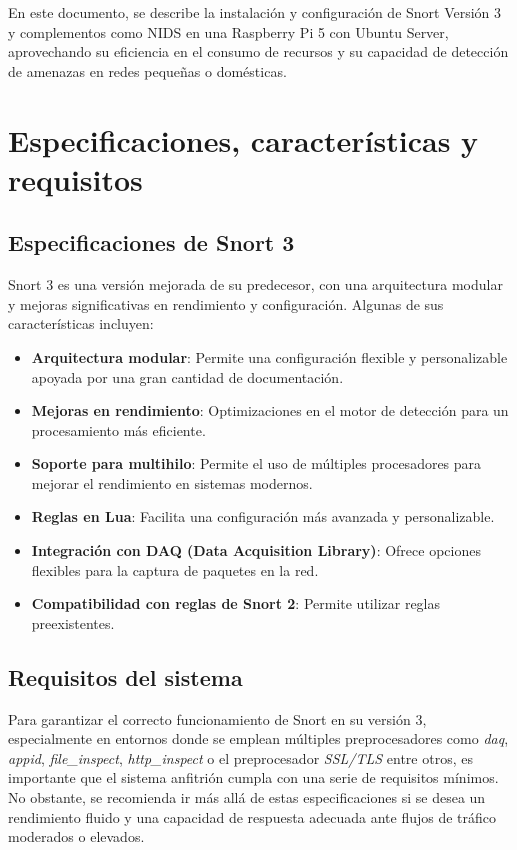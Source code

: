 \documentclass[11pt,a4paper,twoside]{report}
\begin{document}
En este documento, se describe la instalación y configuración de Snort Versión 3 y complementos como NIDS en una Raspberry Pi 5 con Ubuntu Server, aprovechando su eficiencia en el consumo de recursos y su capacidad de detección de amenazas en redes pequeñas o domésticas.

\section{Especificaciones, características y requisitos}

\subsection{Especificaciones de Snort 3}

Snort 3 es una versión mejorada de su predecesor, con una arquitectura modular y mejoras significativas en rendimiento y configuración. Algunas de sus características incluyen:

\begin{itemize}
\item \textbf{Arquitectura modular}: Permite una configuración flexible y personalizable apoyada por una gran cantidad de documentación.
\item \textbf{Mejoras en rendimiento}: Optimizaciones en el motor de detección para un procesamiento más eficiente.
\item \textbf{Soporte para multihilo}: Permite el uso de múltiples procesadores para mejorar el rendimiento en sistemas modernos.
\item \textbf{Reglas en Lua}: Facilita una configuración más avanzada y personalizable.
\item \textbf{Integración con DAQ (Data Acquisition Library)}: Ofrece opciones flexibles para la captura de paquetes en la red.
\item \textbf{Compatibilidad con reglas de Snort 2}: Permite utilizar reglas preexistentes.
\end{itemize}

\subsection{Requisitos del sistema}

Para garantizar el correcto funcionamiento de Snort en su versión 3, especialmente en entornos donde se emplean múltiples preprocesadores como \textit{daq}, \textit{appid}, \textit{file\_inspect}, \textit{http\_inspect} o el preprocesador \textit{SSL/TLS} entre otros, es importante que el sistema anfitrión cumpla con una serie de requisitos mínimos. No obstante, se recomienda ir más allá de estas especificaciones si se desea un rendimiento fluido y una capacidad de respuesta adecuada ante flujos de tráfico moderados o elevados.\newline
\end{document}
